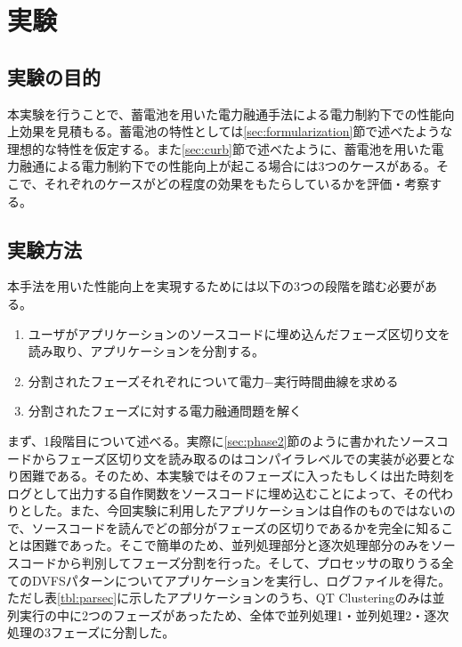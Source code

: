 \chapter{実験}
\label{chap:experiment}


\section{実験の目的}
\label{sec:purpose}

本実験を行うことで、蓄電池を用いた電力融通手法による電力制約下での性能向上効果を見積もる。蓄電池の特性としては\ref{sec:formularization}節で述べたような理想的な特性を仮定する。また\ref{sec:curb}節で述べたように、蓄電池を用いた電力融通による電力制約下での性能向上が起こる場合には3つのケースがある。そこで、それぞれのケースがどの程度の効果をもたらしているかを評価・考察する。



\section{実験方法}
\label{sec:method}

本手法を用いた性能向上を実現するためには以下の3つの段階を踏む必要がある。

\begin{enumerate}
\item ユーザがアプリケーションのソースコードに埋め込んだフェーズ区切り文を読み取り、アプリケーションを分割する。
\item 分割されたフェーズそれぞれについて電力−実行時間曲線を求める
\item 分割されたフェーズに対する電力融通問題を解く
\end{enumerate}

まず、1段階目について述べる。実際に\ref{sec:phase2}節のように書かれたソースコードからフェーズ区切り文を読み取るのはコンパイラレベルでの実装が必要となり困難である。そのため、本実験ではそのフェーズに入ったもしくは出た時刻をログとして出力する自作関数をソースコードに埋め込むことによって、その代わりとした。また、今回実験に利用したアプリケーションは自作のものではないので、ソースコードを読んでどの部分がフェーズの区切りであるかを完全に知ることは困難であった。そこで簡単のため、並列処理部分と逐次処理部分のみをソースコードから判別してフェーズ分割を行った。そして、プロセッサの取りうる全てのDVFSパターンについてアプリケーションを実行し、ログファイルを得た。ただし表\ref{tbl:parsec}に示したアプリケーションのうち、QT Clusteringのみは並列実行の中に2つのフェーズがあったため、全体で並列処理1・並列処理2・逐次処理の3フェーズに分割した。

